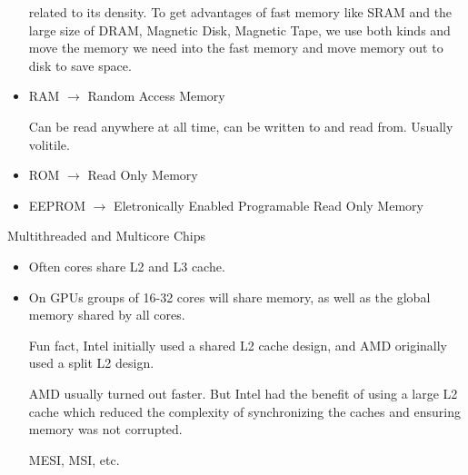 \documentclass{report}
\begin{document}
\begin{description}
\begin{itemize}
                related to its density. To get advantages of fast memory
                like SRAM and the large size of DRAM, Magnetic Disk, Magnetic Tape,
                we use both kinds and move the memory we need into the fast
                memory and move memory out to disk to save space.
            \item RAM $\to$ Random Access Memory
                \begin{mdframed}
                    Can be read anywhere at all time, can be written to and
                    read from. Usually volitile.
                \end{mdframed}
            \item ROM $\to$ Read Only Memory
            \item EEPROM $\to$ Eletronically Enabled Programable Read Only Memory
        \end{itemize}
    \item Multithreaded and Multicore Chips
        \begin{itemize}
            \item Often cores share L2 and L3 cache.
            \item On GPUs groups of 16-32 cores will share memory, as well
                as the global memory shared by all cores.
                \pagebreak
                \begin{mdframed}
                    Fun fact, Intel initially used a shared L2 cache design,
                    and AMD originally used a split L2 design.

                    AMD usually turned out faster. But Intel had the benefit
                    of using a large L2 cache which reduced the complexity of
                    synchronizing the caches and ensuring memory was not corrupted.

                    MESI, MSI, etc.


\end{mdframed}
\end{itemize}
\end{description}
\end{document}
